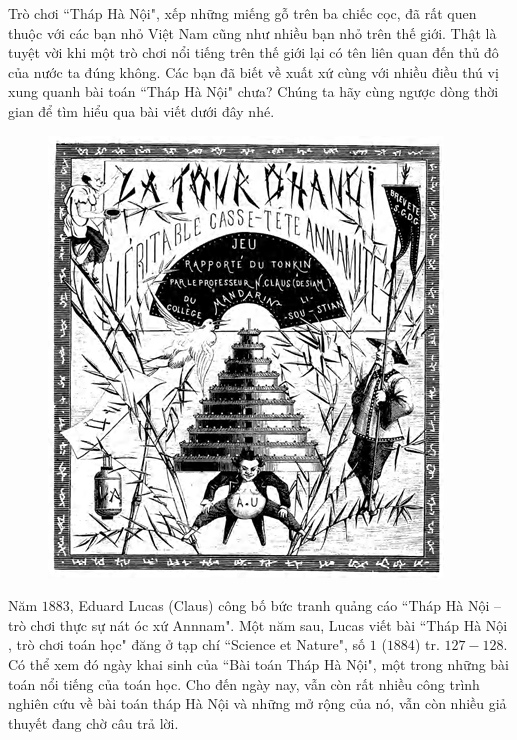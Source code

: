\begin{multicols}{2}
	Trò chơi ``Tháp Hà Nội", xếp những miếng gỗ trên ba chiếc cọc, đã rất quen thuộc với các bạn nhỏ Việt Nam cũng như nhiều bạn nhỏ trên thế giới. Thật là tuyệt vời khi một trò chơi nổi tiếng trên thế giới lại có tên liên quan đến thủ đô của nước ta đúng không. Các bạn đã biết về xuất xứ cùng với nhiều điều thú vị xung quanh bài toán ``Tháp Hà Nội" chưa? Chúng ta hãy cùng ngược dòng thời gian để tìm hiểu qua bài viết dưới đây nhé.
	\begin{figure}[H]
		\centering
		\vspace*{-5pt}
		\captionsetup{labelformat= empty, justification=centering}
		\includegraphics[width=1\linewidth]{1.1}
		\vspace*{-15pt}
	\end{figure}
	Năm $1883$, Eduard Lucas (Claus) công bố  bức tranh quảng cáo ``Tháp Hà Nội --  trò chơi thực sự nát óc xứ Annnam".
	\vskip 0.1cm
	Một năm sau, Lucas viết bài ``Tháp Hà Nội , trò chơi toán học" đăng ở tạp chí ``Science et Nature", số $1$ ($1884$) tr. $127-128$. Có thể xem đó ngày khai sinh của ``Bài toán Tháp Hà Nội", một trong những bài toán nổi tiếng của toán học. Cho đến ngày nay, vẫn còn rất nhiều công trình nghiên cứu về bài toán tháp Hà Nội và những mở rộng của nó, vẫn còn nhiều giả thuyết đang chờ câu trả lời.

\end{multicols}
